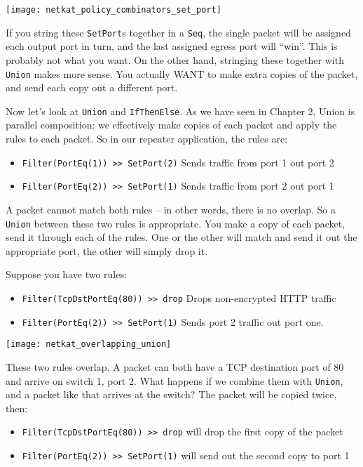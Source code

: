 \texttt{[image: netkat\_policy\_combinators\_set\_port]}

If you string these \texttt{SetPort}s together in a \texttt{Seq}, the single packet will be assigned each output port in turn, and
the last assigned egress port will ``win''.  
This is probably not what you want.  
On the other hand, stringing these together with \texttt{Union} makes more sense.  You actually WANT to make
extra copies of the packet, and send each copy out a different port.  

Now let's look at \texttt{Union} and \texttt{IfThenElse}.  
As we have seen in Chapter 2, Union is parallel composition:
we effectively make copies of each packet and apply the rules to each packet.  So in our 
repeater application, the rules are:

\begin{itemize}
  \item \texttt{Filter(PortEq(1)) >> SetPort(2)} Sends traffic from port 1 out port 2 
  \item \texttt{Filter(PortEq(2)) >> SetPort(1)} Sends traffic from port 2 out port 1 
\end{itemize}

A packet cannot match both rules -- in other words, there is no overlap.  So a \texttt{Union} between
these two rules is appropriate.  You make a copy of each packet, send it through each of the rules.  
One or the other will match and send it out the appropriate port, the other will simply drop it.  

Suppose you have two rules:

\begin{itemize}
  \item \texttt{Filter(TcpDstPortEq(80)) >> drop} Drops non-encrypted HTTP traffic 
  \item \texttt{Filter(PortEq(2)) >> SetPort(1)} Sends port 2 traffic out port one.
\end{itemize}

\texttt{[image: netkat\_overlapping\_union]}

These two rules overlap.  A packet can both have a TCP destination port of 80 and
arrive on switch 1, port 2.  What happens if we combine them with \texttt{Union}, and a packet
like that arrives at the switch?  The packet will be copied twice, then:

\begin{itemize}
  \item \texttt{Filter(TcpDstPortEq(80)) >> drop} will drop the first copy of the packet 
  \item \texttt{Filter(PortEq(2)) >> SetPort(1)} will send out the second copy to port 1
\end{itemize}


